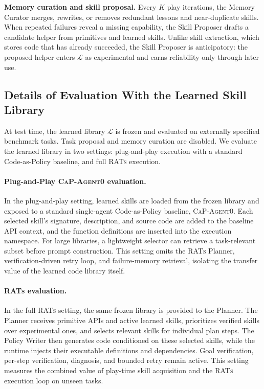 \textbf{Memory curation and skill proposal.}
Every $K$ play iterations, the Memory Curator merges, rewrites, or removes
redundant lessons and near-duplicate skills. When repeated failures reveal a
missing capability, the Skill Proposer drafts a candidate helper from
primitives and learned skills. Unlike skill extraction, which stores code that
has already succeeded, the Skill Proposer is anticipatory: the proposed helper
enters $\mathcal{L}$ as experimental and earns reliability only through later
use.

\subsection{Details of Evaluation With the Learned Skill Library}
\label{sec:appendix_test_time}


At test time, the learned library $\mathcal{L}$ is frozen and evaluated on
externally specified benchmark tasks. Task proposal and memory curation are disabled. We evaluate the learned library in two settings:
plug-and-play execution with a standard Code-as-Policy baseline, and full
\textsc{RATs} execution.


\paragraph{Plug-and-Play \textsc{CaP-Agent0} evaluation.}
In the plug-and-play setting, learned skills are loaded from the frozen library
and exposed to a standard single-agent Code-as-Policy baseline, \textsc{CaP-Agent0}.
Each selected skill's signature, description, and source code are added to the
baseline API context, and the function definitions are inserted into the
execution namespace. For large libraries, a lightweight selector can retrieve a
task-relevant subset before prompt construction. This setting omits the
\textsc{RATs} Planner, verification-driven retry loop, and failure-memory
retrieval, isolating the transfer value of the learned code library itself.

\paragraph{\textsc{RATs} evaluation.}
In the full \textsc{RATs} setting, the same frozen library is provided to the
Planner. The Planner receives primitive APIs and active learned skills,
prioritizes verified skills over experimental ones, and selects relevant skills
for individual plan steps. The Policy Writer then generates code conditioned on
these selected skills, while the runtime injects their executable definitions
and dependencies. Goal verification, per-step verification, diagnosis, and
bounded retry remain active. This setting measures the combined value of
play-time skill acquisition and the \textsc{RATs} execution loop on unseen
tasks.
